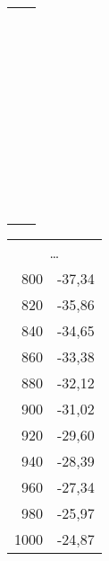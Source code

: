 \begin{table}[h]
\begin{tabular}{rl}
\end{tabular}
\begin{tabular}{c|c}
&\\&\\&\\&\\&\\&\\&\\&\\&\\&\\&\\&\\&\\&\\&\\&\\&\\&\\&\\&\\&\\&\\&\\&\\&\\&\\&\\&\\&\\&\\&\\&\\&\\&\\&\\&\\&\\&\\&\\&\\
\end{tabular}
\begin{tabular}{rl}
\multicolumn{2}{c}{\dots}\\
800	&	-37,34\\
820	&	-35,86\\
840	&	-34,65\\
860	&	-33,38\\
880	&	-32,12\\
900	&	-31,02\\
920	&	-29,60\\
940	&	-28,39\\
960	&	-27,34\\
980	&	-25,97\\
1000	&	-24,87\\

\end{tabular}
\end{table}
